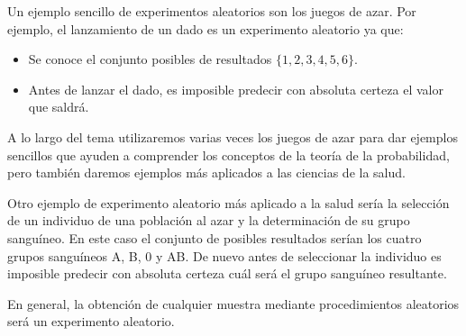 \begin{frame}
{Un ejemplo sencillo de experimentos aleatorios son los juegos de azar. Por ejemplo, el lanzamiento de un dado es un experimento aleatorio ya
que:
\begin{itemize}
\item Se conoce el conjunto posibles de resultados $\{1,2,3,4,5,6\}$.
\item Antes de lanzar el dado, es imposible predecir con absoluta certeza el valor que saldrá. 
\end{itemize}

A lo largo del tema utilizaremos varias veces los juegos de azar para dar ejemplos sencillos que ayuden a comprender los conceptos de la
teoría de la probabilidad, pero también daremos ejemplos más aplicados a las ciencias de la salud. 

Otro ejemplo de experimento aleatorio más aplicado a la salud sería la selección de un individuo de una población al azar y la determinación
de su grupo sanguíneo. En este caso el conjunto de posibles resultados serían los cuatro grupos sanguíneos A, B, 0 y AB. De nuevo antes de
seleccionar la individuo es imposible predecir con absoluta certeza cuál será el grupo sanguíneo resultante. 

En general, la obtención de cualquier muestra mediante procedimientos aleatorios será un experimento aleatorio.  
}
\end{frame}


